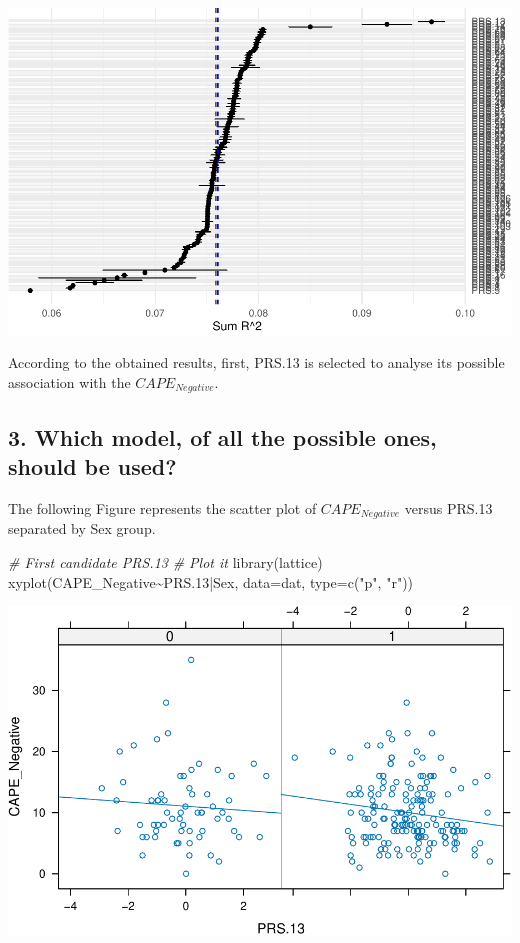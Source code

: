 \documentclass[
]{article}
\newenvironment{Shaded}{\begin{snugshade}}{\end{snugshade}}
\newcommand{\AttributeTok}[1]{\textcolor[rgb]{0.77,0.63,0.00}{#1}}
\newcommand{\CommentTok}[1]{\textcolor[rgb]{0.56,0.35,0.01}{\textit{#1}}}
\newcommand{\FloatTok}[1]{\textcolor[rgb]{0.00,0.00,0.81}{#1}}
\newcommand{\FunctionTok}[1]{\textcolor[rgb]{0.00,0.00,0.00}{#1}}
\newcommand{\NormalTok}[1]{#1}
\newcommand{\SpecialCharTok}[1]{\textcolor[rgb]{0.00,0.00,0.00}{#1}}
\newcommand{\StringTok}[1]{\textcolor[rgb]{0.31,0.60,0.02}{#1}}
\begin{document}
\includegraphics{Real_data_CAPE_Negative_code_files/figure-latex/unnamed-chunk-5-1.pdf}

According to the obtained results, first, PRS.13 is selected to analyse
its possible association with the \(CAPE_{Negative}\).

\hypertarget{which-model-of-all-the-possible-ones-should-be-used}{%
\subsection{3. Which model, of all the possible ones, should be
used?}\label{which-model-of-all-the-possible-ones-should-be-used}}

The following Figure represents the scatter plot of \(CAPE_{Negative}\)
versus PRS.13 separated by Sex group.

\begin{Shaded}
\begin{Highlighting}[]
\CommentTok{\# First candidate PRS.13}
\CommentTok{\# Plot it}
\FunctionTok{library}\NormalTok{(lattice) }
\FunctionTok{xyplot}\NormalTok{(CAPE\_Negative}\SpecialCharTok{\textasciitilde{}}\NormalTok{PRS}\FloatTok{.13}\SpecialCharTok{|}\NormalTok{Sex, }\AttributeTok{data=}\NormalTok{dat,  }\AttributeTok{type=}\FunctionTok{c}\NormalTok{(}\StringTok{"p"}\NormalTok{, }\StringTok{"r"}\NormalTok{))}
\end{Highlighting}
\end{Shaded}

\includegraphics{Real_data_CAPE_Negative_code_files/figure-latex/unnamed-chunk-6-1.pdf}
\end{document}
